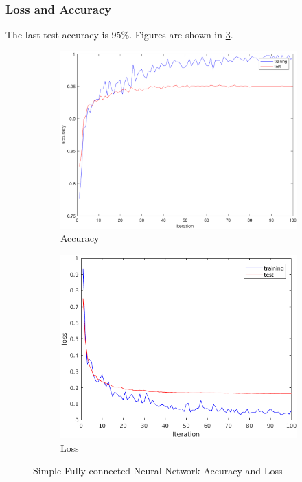 \subsubsection{Loss and Accuracy}
The last test accuracy is 95\%.
Figures are shown in \ref{fig:25}.
\begin{figure}[htbp]
	\centering
	\begin{subfigure}[t]{0.8\textwidth}
	    \centering
        \includegraphics[width=\textwidth]{hw6/accuracy1.png}
		\caption{Accuracy}\label{fig:25a}
	\end{subfigure}
	\begin{subfigure}[t]{0.8\textwidth}
	    \centering
		\includegraphics[width=\textwidth]{hw6/loss1.png}
		\caption{Loss}\label{fig:25b}
	\end{subfigure}
	\caption{Simple Fully-connected Neural Network Accuracy and Loss}\label{fig:25}
\end{figure}

